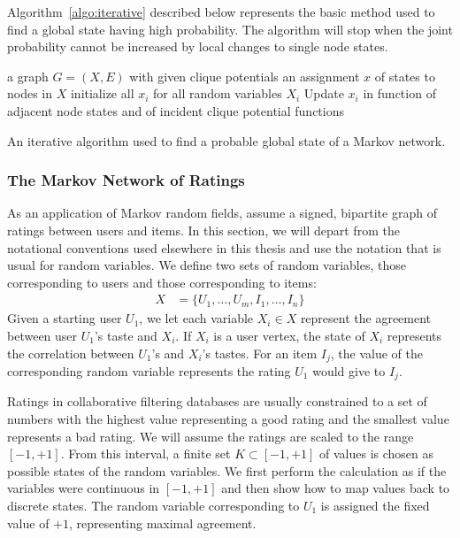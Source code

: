 \documentclass[11pt,a4paper]{book}
\begin{document}
Algorithm~\ref{algo:iterative} described below represents the basic
method used to find a global state having high probability.
The algorithm will 
stop when the joint probability cannot be increased by local changes to
single node states.   

\begin{algorithm}
  \begin{algorithmic}
    \REQUIRE a  graph $G=(X, E)$ with given clique potentials
    \ENSURE an assignment $x$ of states to nodes in $X$
    \STATE initialize all $x_i$ for all random variables $X_i$
    \REPEAT
    \STATE Update $x_i$ in function of adjacent node states and of incident
    clique potential functions
    \ENDFOR
  \end{algorithmic}
  \caption{
    An iterative algorithm used to find a probable global state of a
    Markov network.
  }
  \label{algo:iterative}
\end{algorithm}

\subsubsection{The Markov Network of Ratings}
As an application of Markov random fields, assume a signed, bipartite
graph of ratings between users and items. 
In this section, we will depart from the notational conventions used
elsewhere in this thesis and use the notation that is usual for random
variables. 
We define two sets of random variables, those
corresponding to users and those corresponding to items:
\begin{align}
  X &= \{ U_1, \ldots, U_m, I_1, \ldots, I_n \} 
\end{align}
Given a starting user $U_1$, we let each variable $X_i\in X$
represent the 
agreement between user $U_1$'s taste and $X_i$.  
If $X_i$ is a user vertex, the state of $X_i$ represents the
correlation between $U_1$'s and $X_i$'s tastes.
For an item $I_j$, the value of the corresponding random variable
represents the rating $U_1$ would give to $I_j$.  

Ratings in collaborative filtering databases are usually constrained to a set
of numbers with the highest value representing a good rating and the
smallest value represents a bad rating.  
We will assume the ratings are scaled to the range $[-1, +1]$. 
From this interval, a finite set $K \subset [-1, +1]$ of values is
chosen as possible states of the random variables.  
We first perform the
calculation as if the variables were continuous in $[-1, +1]$ and then show how
to map values back to discrete states.  
The random variable corresponding to $U_1$ is assigned the
fixed value of $+1$, representing maximal agreement.  
\end{document}
